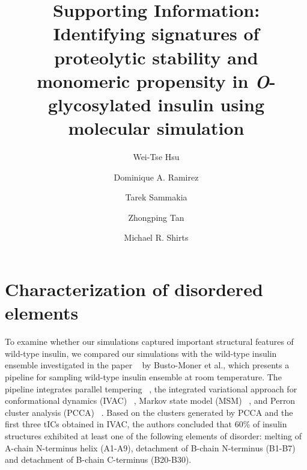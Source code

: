 \documentclass[sn-vancouver]{sn-jnl}
\begin{document}
\title[Supporting Information]{Supporting Information: Identifying signatures of proteolytic stability and monomeric propensity in \emph{O}-glycosylated insulin using molecular simulation}

\author[1]{Wei-Tse Hsu}
\author[2]{Dominique A. Ramirez}
\author[3]{Tarek Sammakia}
\author*[4]{Zhongping Tan}
\author*[1]{Michael R. Shirts}





\maketitle


\section{Characterization of disordered elements}
To examine whether our simulations captured important structural features of wild-type insulin, we compared our simulations with the wild-type insulin ensemble investigated in the paper ~\cite{busto2021structural} by Busto-Moner et al., which presents a pipeline for sampling wild-type insulin ensemble at room temperature. The pipeline integrates parallel tempering ~\cite{hansmann1997parallel, earl2005parallel}, the integrated variational approach for conformational dynamics (IVAC) ~\cite{nuske2014variational, lorpaiboon2020integrated}, Markov state model (MSM) ~\cite{prinz2011markov, bowman2013introduction}, and Perron cluster analysis (PCCA) ~\cite{schutte1999direct}. Based on the clusters generated by PCCA and the first three tICs obtained in IVAC, the authors concluded that 60\% of insulin structures exhibited at least one of the following elements of disorder: melting of A-chain N-terminus helix (A1-A9), detachment of B-chain N-terminus (B1-B7) and detachment of B-chain C-terminus (B20-B30). 
\end{document}
